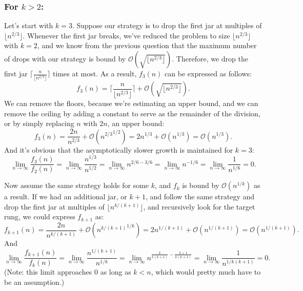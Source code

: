 \documentclass[12pt, letterpaper]{article}
\begin{document}
\subsubsection*{For $k > 2$:}
Let's start with $k = 3$.
Suppose our strategy is to drop the first jar at multiples of $\lfloor n^{2/3} \rfloor$. 
Whenever the first jar breaks, we've reduced the problem to size $\lfloor n^{2/3} \rfloor$ with $k = 2$, and we know from the previous question that the maximum number of drops with our strategy is bound by $\mathcal{O}(\sqrt{\lfloor n^{2/3} \rfloor})$.
Therefore, we drop the first jar $\lceil \frac{n}{\lfloor n^{2/3} \rfloor} \rceil$ times at most.
As a result, $f_3(n)$ can be expressed as follows:
\begin{equation*}
    f_3(n) = \lceil \frac{n}{\lfloor n^{2/3} \rfloor} \rceil + \mathcal{O}(\sqrt{\lfloor n^{2/3} \rfloor}) .
\end{equation*}
We can remove the floors, because we're estimating an upper bound, and we can remove the ceiling by adding a constant to serve as the remainder of the division, or by simply replacing $n$ with $2n$, an upper bound:
\begin{equation*}
    f_3(n) = \frac{2n}{n^{2/3}} + \mathcal{O}({n^{2/3}}^{1/2}) = 2n^{1/3} + \mathcal{O}({n^{1/3}}) = \mathcal{O}(n^{1/3}).
\end{equation*}
And it's obvious that the asymptotically slower growth is maintained for $k = 3$:
\begin{equation*}
    \lim_{n \to \infty} \frac{f_{3}(n)}{f_{2}(n)} = \lim_{n \to \infty} \frac{n^{1/3}}{n^{1/2}} = \lim_{n \to \infty} n^{2/6 - 3/6} =\lim_{n \to \infty}  n^{-1/6} = \lim_{n \to \infty} \frac{1}{n^{1/6}} = 0.
\end{equation*}

Now assume the same strategy holds for some $k$, and $f_k$ is bound by $\mathcal{O}(n^{1/k})$ as a result.
If we had an additional jar, or $k + 1$, and follow the same strategy and drop the first jar at multiples of $\lfloor n^{k/(k+1)} \rfloor$, and recursively look for the target rung, we could express $f_{k+1}$ as:
\begin{equation*}
    f_{k+1}(n) = \frac{2n}{n^{k/(k+1)}} + \mathcal{O}({n^{k/(k+1)}}^{1/k}) = 2n^{1/(k+1)} + \mathcal{O}(n^{1/(k+1)}) = \mathcal{O}(n^{1/(k+1)}).
\end{equation*}
And
\begin{equation*}
    \lim_{n \to \infty} \frac{f_{k+1}(n)}{f_{k}(n)} = \lim_{n \to \infty} \frac{n^{1/(k+1)}}{n^{1/k}} = \lim_{n \to \infty} n^{\frac{k}{k(k+1)} - \frac{k+1}{k(k+1)}} = \lim_{n \to \infty} \frac{1}{n^{1/k(k+1)}} = 0.
\end{equation*}
(Note: this limit approaches 0 as long as $k < n$, which would pretty much have to be an assumption.)
\end{document}
